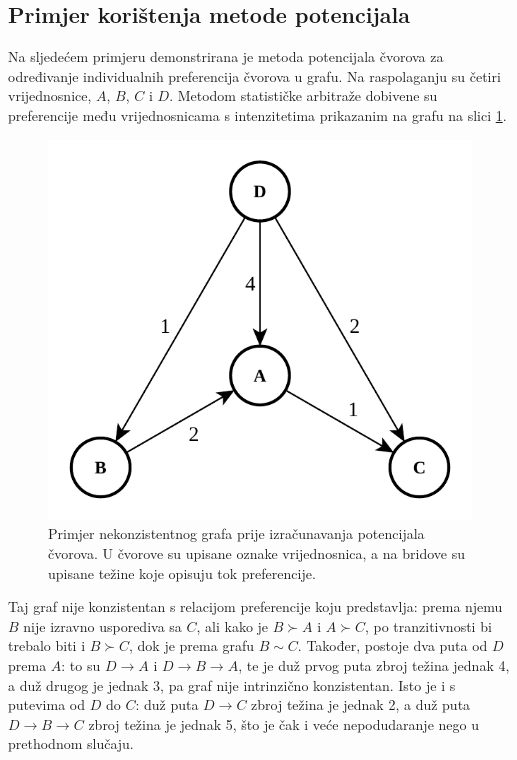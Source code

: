 \documentclass[lmodern, utf8, diplomski, numeric]{fer}
\begin{document}
  \subsection{Primjer korištenja metode potencijala}
  Na sljedećem primjeru demonstrirana je metoda potencijala čvorova za određivanje individualnih preferencija čvorova u grafu.
  Na raspolaganju su četiri vrijednosnice, $A$, $B$, $C$ i $D$.
  Metodom statističke arbitraže dobivene su preferencije među vrijednosnicama s intenzitetima prikazanim na grafu na slici \ref{fig:graph-eg-1}.
  
  \begin{figure}[h]
    \centering
    \includegraphics[width=0.5\linewidth]{graphics/graph-eg-1.pdf}
    \caption{Primjer nekonzistentnog grafa prije izračunavanja potencijala čvorova.
      U čvorove su upisane oznake vrijednosnica, a na bridove su upisane težine koje opisuju tok preferencije.}
    \label{fig:graph-eg-1}
  \end{figure}
  
  Taj graf nije konzistentan s relacijom preferencije koju predstavlja: prema njemu $B$ nije izravno usporediva sa $C$, ali kako je $B \succ A$ i $A \succ C$, po tranzitivnosti bi trebalo biti i $B \succ C$, dok je prema grafu $B \sim C$.
  Također, postoje dva puta od $D$ prema $A$: to su $D \rightarrow A$ i $D \rightarrow B \rightarrow A$, te je duž prvog puta zbroj težina jednak 4, a duž drugog je jednak 3, pa graf nije intrinzično konzistentan.
  Isto je i s putevima od $D$ do $C$: duž puta $D \rightarrow C$ zbroj težina je jednak 2, a duž puta $D \rightarrow B \rightarrow C$ zbroj težina je jednak 5, što je čak i veće nepodudaranje nego u prethodnom slučaju.
  
\end{document}
